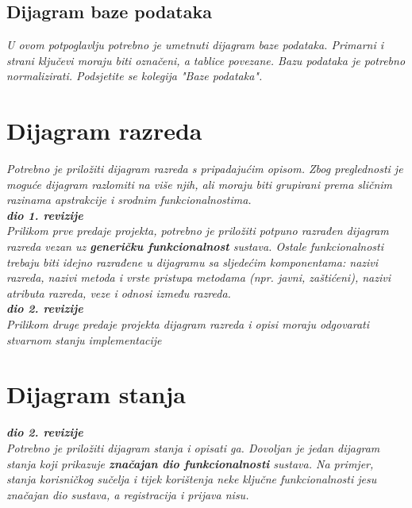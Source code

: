 			
			\subsection{Dijagram baze podataka}
				\textit{ U ovom potpoglavlju potrebno je umetnuti dijagram baze podataka. Primarni i strani ključevi moraju biti označeni, a tablice povezane. Bazu podataka je potrebno normalizirati. Podsjetite se kolegija "Baze podataka".}
			
			\eject
			
			
		\section{Dijagram razreda}
		
			\textit{Potrebno je priložiti dijagram razreda s pripadajućim opisom. Zbog preglednosti je moguće dijagram razlomiti na više njih, ali moraju biti grupirani prema sličnim razinama apstrakcije i srodnim funkcionalnostima.}\\
			
			\textbf{\textit{dio 1. revizije}}\\
			
			\textit{Prilikom prve predaje projekta, potrebno je priložiti potpuno razrađen dijagram razreda vezan uz \textbf{generičku funkcionalnost} sustava. Ostale funkcionalnosti trebaju biti idejno razrađene u dijagramu sa sljedećim komponentama: nazivi razreda, nazivi metoda i vrste pristupa metodama (npr. javni, zaštićeni), nazivi atributa razreda, veze i odnosi između razreda.}\\
			
			\textbf{\textit{dio 2. revizije}}\\			
			
			\textit{Prilikom druge predaje projekta dijagram razreda i opisi moraju odgovarati stvarnom stanju implementacije}
			
			
			
			\eject
		
		\section{Dijagram stanja}
			
			
			\textbf{\textit{dio 2. revizije}}\\
			
			\textit{Potrebno je priložiti dijagram stanja i opisati ga. Dovoljan je jedan dijagram stanja koji prikazuje \textbf{značajan dio funkcionalnosti} sustava. Na primjer, stanja korisničkog sučelja i tijek korištenja neke ključne funkcionalnosti jesu značajan dio sustava, a registracija i prijava nisu. }
			
